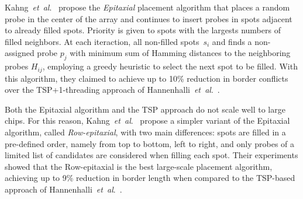 \documentclass{llncs}
\newcommand{\ignore}[1]{}
\begin{document}
Kahng~{\it et~al}.~\cite{KAHNG02} propose the \emph{Epitaxial} placement algorithm that
places a random probe in the center of the array and continues to
insert probes in spots adjacent to already filled spots. Priority is given
to spots with the largests numbers of filled neighbors. At each iteraction,
all non-filled spots~$s_i$ and finds a non-assigned probe
$p_j$ with minimum sum of Hamming distances to the neighboring probes
$H_{ij}$, employing a greedy heuristic to select the next spot to be filled.
With this algorithm, they claimed to
achieve up to 10\% reduction in border conflicts over the TSP+1-threading
approach of Hannenhalli~{\it et~al}.\ \cite{HANNENHALLI02}.

\ignore{
The major problem with the Epitaxial and the TSP-based algorithm is that they
have at least quadratic time complexity and thus are not scalable for the
latest million-probe microarrays. According to their experiments, the TSP
approach needed around 32 minutes to produce the layout of a 200\,x\,200
chip, whereas the Epitaxial algorithm needed 74 minutes on average. For a
500\,x\,500 chip, the TSP took over 30 hours to complete, whereas the
Epitaxial algorithm did not complete ``due to prohibitively large running
time or memory requirements'' \cite{KAHNG02}.
}

\ignore{
This observation has led to the development of two new algorithms by
\cite{KAHNG03A}. The first one, called Sliding-window Matching (SWM), is not
exactly a placement algorithm as it iteratively improves an initial placement
that can be constructed by, for instance, TSP and 1-threading. Improvements
are achieved by selecting an independent set of spots inside the window and
optimally replacing their probes using a minimum-weight perfect matching
algorithm. The term independent refers to probes that can be replaced without
affecting the border length of the other selected probes.
}

Both the Epitaxial algorithm and the TSP approach do not scale well to large
chips.  For this reason, Kahng~{\it et~al}.~\cite{KAHNG03A} propose a simpler variant
of the Epitaxial algorithm, called \emph{Row-epitaxial}, with two main
differences: spots are filled in a pre-defined order, namely
from top to bottom, left to right, and only probes of a limited list of candidates are
considered when filling each spot. Their experiments showed
that the Row-epitaxial is the best large-scale placement algorithm,
achieving up to 9\% reduction in border length when compared to the
TSP-based approach of Hannenhalli~{\it et~al}.\ \cite{HANNENHALLI02}.
\end{document}
